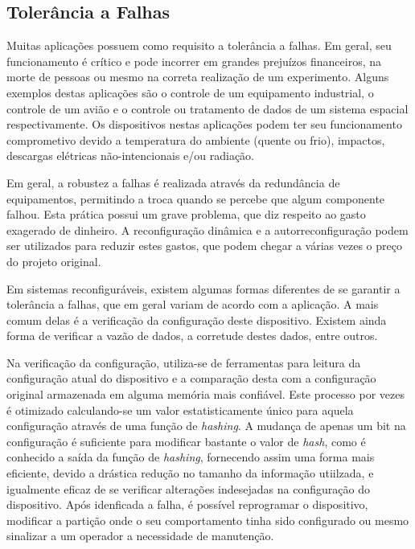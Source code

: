 \documentclass[11pt,a4paper,oneside]{book}
\begin{document}
\subsection{Tolerância a Falhas}
Muitas aplicações possuem como requisito a tolerância a falhas.
Em geral, seu funcionamento é crítico e pode incorrer em grandes prejuízos financeiros, na morte de pessoas ou mesmo na correta realização de um experimento.
Alguns exemplos destas aplicações são o controle de um equipamento industrial, o controle de um avião e o controle ou tratamento de dados de um sistema espacial respectivamente.
Os dispositivos nestas aplicações podem ter seu funcionamento comprometivo devido a temperatura do ambiente (quente ou frio), impactos, descargas elétricas não-intencionais e/ou radiação.

Em geral, a robustez a falhas é realizada através da redundância de equipamentos, permitindo a troca quando se percebe que algum componente falhou.
Esta prática possui um grave problema, que diz respeito ao gasto exagerado de dinheiro.
A reconfiguração dinâmica e a autorreconfiguração podem ser utilizados para reduzir estes gastos, que podem chegar a várias vezes o preço do projeto original.

Em sistemas reconfiguráveis, existem algumas formas diferentes de se garantir a tolerância a falhas, que em geral variam de acordo com a aplicação.
A mais comum delas é a verificação da configuração deste dispositivo.
Existem ainda forma de verificar a vazão de dados, a corretude destes dados, entre outros.

Na verificação da configuração, utiliza-se de ferramentas para leitura da configuração atual do dispositivo e a comparação desta com a configuração original armazenada em alguma memória mais confiável.
Este processo por vezes é otimizado calculando-se um valor estatisticamente único para aquela configuração através de uma função de \textit{hashing}.
A mudança de apenas um bit na configuração é suficiente para modificar bastante o valor de \textit{hash}, como é conhecido a saída da função de \textit{hashing}, fornecendo assim uma forma mais eficiente, devido a drástica redução no tamanho da informação utiilzada, e igualmente eficaz de se verificar alterações indesejadas na configuração do dispositivo.
Após idenficada a falha, é possível reprogramar o dispositivo, modificar a partição onde o seu comportamento tinha sido configurado ou mesmo sinalizar a um operador a necessidade de manutenção.
\end{document}
